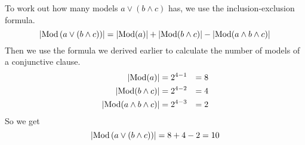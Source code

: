 \documentclass[11pt]{article}
\begin{document}
\begin{answer}
    To work out how many models $a \lor (b \land c)$ has, we use the inclusion-exclusion formula.
    \[\left|\mathrm{Mod}\left(a \lor (b \land c)\right)\right| = \left|\mathrm{Mod}(a)\right| + \left|\mathrm{Mod}(b \land c)\right| - \left|\mathrm{Mod}(a \land b \land c)\right| \]
    Then we use the formula we derived earlier to calculate the number of models of a conjunctive clause.
    \[\begin{aligned}
        \left|\mathrm{Mod}(a)\right| & = 2^{4-1}&= 8\\
        \left|\mathrm{Mod}(b \land c)\right| & = 2^{4-2}&= 4\\
        \left|\mathrm{Mod}(a \land b \land c)\right|&= 2^{4-3}& = 2 
    \end{aligned} \]
    So we get 
    \[\left|\mathrm{Mod}\left(a \lor (b \land c)\right)\right| = 8 + 4 - 2 = 10 \]
\end{answer}





\printindex
\end{document}
